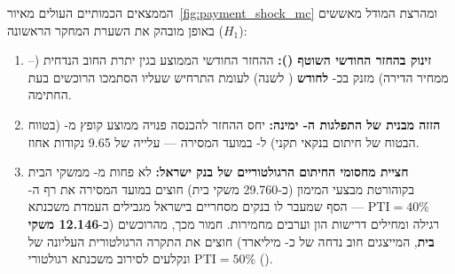 הממצאים הכמותיים העולים מאיור~\ref{fig:payment_shock_mc} ומהרצת המודל מאששים באופן מובהק את השערת המחקר הראשונה ($H_1$):
\begin{enumerate}[label=\textbf{\arabic*.},rightmargin=0.6cm]
  \item \textbf{זינוק בהחזר החודשי השוטף ():} ההחזר החודשי הממוצע בגין יתרת החוב הנדחית (-- ממחיר הדירה) מזנק בכ-\textbf{ לחודש} ( לשנה) לעומת התרחיש שעליו הסתמכו הרוכשים בעת החתימה.
  \item \textbf{הזזה מבנית של התפלגות ה- ימינה:} יחס ההחזר להכנסה פנויה ממוצע קופץ מ-\textbf{} (בטווח הבטוח של חיתום בנקאי תקני) ל-\textbf{} במועד המסירה — עלייה של \num{9.65} נקודות אחוז.
  \item \textbf{חציית מחסומי החיתום הרגולטוריים של בנק ישראל:} לא פחות מ-\textbf{} ממשקי הבית בקוהורטת מבצעי המימון (כ-\num{29,760} משקי בית) חוצים במועד המסירה את רף ה-\textbf{$\text{PTI} = 40\%$} — הסף שמעבר לו בנקים מסחריים בישראל מגבילים העמדת משכנתא רגילה ומחילים דרישות הון וערבים מחמירות. חמור מכך, \textbf{} מהרוכשים (כ-\textbf{\num{12,146} משקי בית}, המייצגים חוב נדחה של כ- מיליארד) חוצים את התקרה הרגולטורית העליונה של \textbf{$\text{PTI} = 50\%$} ונקלעים לסירוב משכנתא רגולטורי ().
\end{enumerate}

